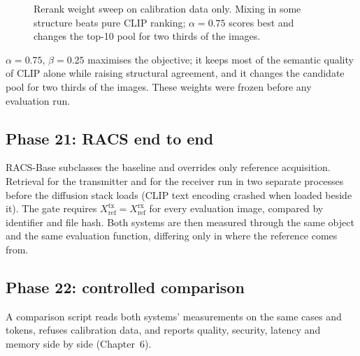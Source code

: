 \begin{figure}[H]
	\centering
	\caption{Rerank weight sweep on calibration data only. Mixing in some structure beats pure CLIP ranking; $\alpha=0.75$ scores best and changes the top-10 pool for two thirds of the images.}
	\label{fig:sweep}
\end{figure}

$\alpha = 0.75$, $\beta = 0.25$ maximises the objective; it keeps most of the semantic quality of
CLIP alone while raising structural agreement, and it changes the candidate pool for two thirds
of the images. These weights were frozen before any evaluation run.

\subsection{Phase 21: RACS end to end}
RACS-Base subclasses the baseline and overrides only reference acquisition. Retrieval for the
transmitter and for the receiver run in two separate processes before the diffusion stack loads
(CLIP text encoding crashed when loaded beside it). The gate requires
$X_{\mathrm{ref}}^{\mathrm{tx}} = X_{\mathrm{ref}}^{\mathrm{rx}}$ for every evaluation image, compared
by identifier and file hash. Both systems are then measured through the same object and the same
evaluation function, differing only in where the reference comes from.

\subsection{Phase 22: controlled comparison}
A comparison script reads both systems' measurements on the same cases and tokens, refuses
calibration data, and reports quality, security, latency and memory side by side (Chapter~6).

